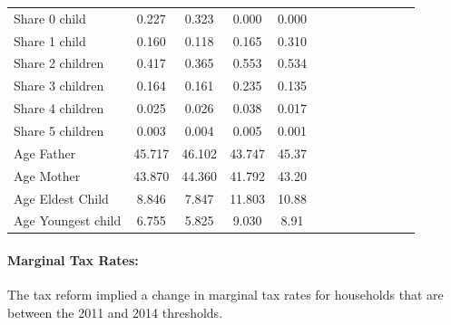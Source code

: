 \begin{table}
{\begin{tabular}{lcccccccccccc}
    \midrule     
    Share 0 child                           & 0.227              	& 0.323	     	&0.000                               	          	&0.000                  \\      
    Share 1 child                           & 0.160              	& 0.118	     	&0.165                               	          	&0.310                  \\      
    Share 2 children                        & 0.417              	& 0.365	     	&0.553                               	          	&0.534                  \\      
    Share 3 children                        & 0.164              	& 0.161	     	&0.235                               	          	&0.135                  \\      
    Share 4 children                        & 0.025              	& 0.026	     	&0.038                               	          	&0.017                  \\      
    Share 5 children                        & 0.003              	& 0.004	     	&0.005                               	          	&0.001                  \\ 
    \midrule     
    Age Father                              & 45.717            	& 46.102	   	&43.747                              	          	&45.37                  \\      
    Age Mother                              & 43.870            	& 44.360	   	&41.792                              	          	&43.20                  \\      
    Age Eldest Child	                      & 8.846              	& 7.847	     	&11.803                              	          	&10.88                  \\      
    Age Youngest child	                    & 6.755             	& 5.825	     	&9.030                               	          	&8.91                   \\  
    \bottomrule    
    \end{tabular}%
    }
\end{table}
    
\renewcommand{\arraystretch}{1}



\paragraph{Marginal Tax Rates: } The tax reform implied a change in marginal tax rates for households that are between the 2011 and 2014 thresholds.







